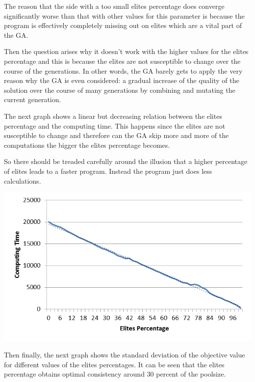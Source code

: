 \par The reason that the side with a too small elites percentage does converge significantly worse than that with other values for this parameter is because the program is effectively completely missing out on elites which are a vital part of the GA.
\vspace{5mm}
\par Then the question arises why it doesn’t work with the higher values for the elites percentage and this is because the elites are not susceptible to change over the course of the generations. In other words, the GA barely gets to apply the very reason why the GA is even considered: a gradual increase of the quality of the solution over the course of many generations by combining and mutating the current generation.
\par
The next graph shows a linear but decreasing relation between the elites percentage and the computing time. This happens since the elites are not susceptible to change and therefore can the GA skip more and more of the computations the bigger the elites percentage becomes.
\par
So there should be treaded carefully around the illusion that a higher percentage of elites leads to a faster program. Instead the program just does less calculations.
\par
\begin{centering}
	\includegraphics[height=8cm]{CTEP}
\end{centering}
Then finally, the next graph shows the standard deviation of the objective value for different values of the elites percentages. It can be seen that the elites percentage obtains optimal consistency around 30 percent of the poolsize.
\par


